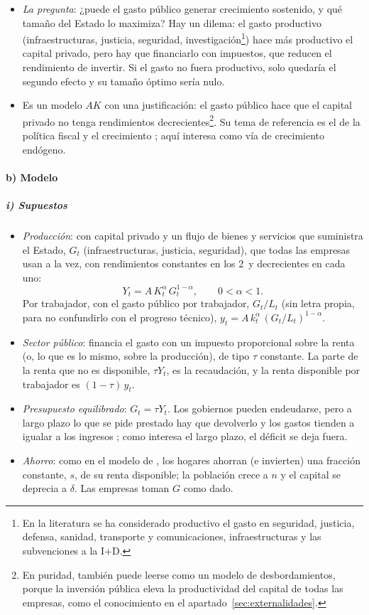 \documentclass[11pt]{article}
\begin{document}
\begin{itemize}
\item \emph{La pregunta}: ¿puede el gasto público generar crecimiento sostenido, y qué tamaño del Estado lo maximiza? Hay un dilema: el gasto productivo (infraestructuras, justicia, seguridad, investigación\footnote{En la literatura se ha considerado productivo el gasto en seguridad, justicia, defensa, sanidad, transporte y comunicaciones, infraestructuras y las subvenciones a la I+D.}) hace más productivo el capital privado, pero hay que financiarlo con impuestos, que reducen el rendimiento de invertir. Si el gasto no fuera productivo, solo quedaría el segundo efecto y su tamaño óptimo sería nulo.
\item Es un modelo $AK$ con una justificación: el gasto público hace que el capital privado no tenga rendimientos decrecientes\footnote{En puridad, también puede leerse como un modelo de desbordamientos, porque la inversión pública eleva la productividad del capital de todas las empresas, como el conocimiento en el apartado~\ref{sec:externalidades}.}. Su tema de referencia es el de la política fiscal y el crecimiento ; aquí interesa como vía de crecimiento endógeno.
\end{itemize}

\paragraph{b) Modelo}

\subparagraph{i) Supuestos}

\begin{itemize}
\item \emph{Producción}: con capital privado y un flujo de bienes y servicios que suministra el Estado, $G_t$ (infraestructuras, justicia, seguridad), que todas las empresas usan a la vez, con rendimientos constantes en los 2~y decrecientes en cada uno:
  \[Y_t=A\,K_t^{\alpha}\,G_t^{1-\alpha},\qquad 0<\alpha<1.\]
  Por trabajador, con el gasto público por trabajador, $G_t/L_t$ (sin letra propia, para no confundirlo con el progreso técnico), $y_t=A\,k_t^{\alpha}\,(G_t/L_t)^{1-\alpha}$.
\item \emph{Sector público}: financia el gasto con un impuesto proporcional sobre la renta (o, lo que es lo mismo, sobre la producción), de tipo $\tau$ constante. La parte de la renta que no es disponible, $\tau Y_t$, es la recaudación, y la renta disponible por trabajador es $(1-\tau)\,y_t$.
\item \emph{Presupuesto equilibrado}: $G_t=\tau Y_t$. Los gobiernos pueden endeudarse, pero a largo plazo lo que se pide prestado hay que devolverlo y los gastos tienden a igualar a los ingresos ; como interesa el largo plazo, el déficit se deja fuera.
\item \emph{Ahorro}: como en el modelo de , los hogares ahorran (e invierten) una fracción constante, $s$, de su renta disponible; la población crece a $n$ y el capital se deprecia a $\delta$. Las empresas toman $G$ como dado.
\end{itemize}
\end{document}
